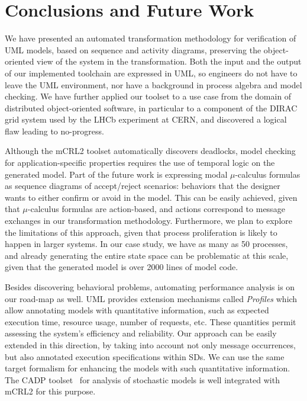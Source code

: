 \documentclass[letter]{llncs}
\newcommand{\secshrink}{\vspace{-.5cm}}
\newcommand{\secshrinkbegin}{\vspace{-.2cm}}
\begin{document}
\secshrink
\section{Conclusions and Future Work}
\label{sec:Conclusions}
\secshrinkbegin
We have presented an automated transformation methodology for verification of UML models, based on sequence and 
activity diagrams, preserving the object-oriented view of the system in the transformation. 
Both the input and the output of our implemented toolchain are expressed in UML, so engineers
do not have to leave the UML environment, nor have a background in process algebra and model checking. 
We have further
applied our toolset to a use case from the domain of distributed object-oriented software, in particular to a component
of the DIRAC grid system used by the LHCb experiment at CERN, and discovered a logical flaw leading to no-progress.

Although the mCRL2 toolset automatically discovers deadlocks, model checking for application-specific properties 
requires the use of temporal logic on the generated model.
Part of the future work is expressing modal $\mu$-calculus formulas as sequence diagrams of accept/reject scenarios: 
behaviors that the designer wants to either confirm or avoid in the model. This can be easily achieved, given that
$\mu$-calculus formulas are action-based, and actions correspond to message exchanges in our transformation methodology.
Furthermore, we plan to explore the limitations of this approach, given that process proliferation is likely to happen
in larger systems. In our case study, we have as many as 50 processes, and already generating the entire state space can be problematic
at this scale, given that the generated model is over 2000 lines of model code.

Besides discovering behavioral problems, automating performance analysis is on our road-map as well.
UML provides extension mechanisms called \emph{Profiles} which allow annotating models with quantitative information,
such as expected execution time, resource usage, number of requests, etc. 
These quantities permit assessing the system’s efficiency and reliability. Our approach can be easily extended
in this direction, by taking into account not only message occurrences, but also annotated execution specifications
within SDs. We can use the same target formalism for enhancing the models with such quantitative information.
The CADP toolset~\cite{GaravelLMS11} for analysis of stochastic models is well integrated with mCRL2 for this
purpose.

\secshrinkbegin
 

\end{document}
